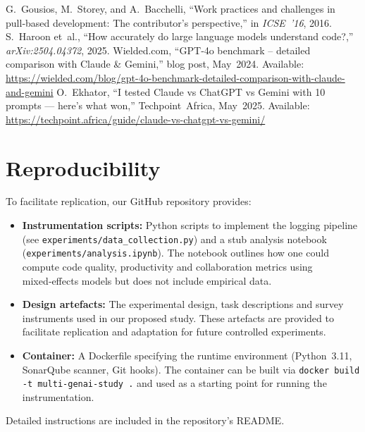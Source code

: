 \documentclass[conference]{IEEEtran}
\begin{document}
\begin{thebibliography}{99}
 G.~Gousios, M.~Storey, and A.~Bacchelli, “Work practices and challenges in pull‑based development: The contributor’s perspective,” in \emph{ICSE ’16}, 2016.
 S.~Haroon et~al., “How accurately do large language models understand code?,” \emph{arXiv:2504.04372}, 2025.
 Wielded.com, “GPT‑4o benchmark – detailed comparison with Claude & Gemini,” blog post, May 2024.  Available: \url{https://wielded.com/blog/gpt-4o-benchmark-detailed-comparison-with-claude-and-gemini}
 O.~Ekhator, “I tested Claude vs ChatGPT vs Gemini with 10 prompts — here’s what won,” Techpoint Africa, May 2025.  Available: \url{https://techpoint.africa/guide/claude-vs-chatgpt-vs-gemini/}
\end{thebibliography}

\appendix
\section{Reproducibility}
To facilitate replication, our GitHub repository provides:
\begin{itemize}
  \item \textbf{Instrumentation scripts:} Python scripts to implement the logging pipeline (see \texttt{experiments/data\_collection.py}) and a stub analysis notebook (\texttt{experiments/analysis.ipynb}).  The notebook outlines how one could compute code quality, productivity and collaboration metrics using mixed‑effects models but does not include empirical data.
  \item \textbf{Design artefacts:} The experimental design, task descriptions and survey instruments used in our proposed study.  These artefacts are provided to facilitate replication and adaptation for future controlled experiments.
  \item \textbf{Container:} A Dockerfile specifying the runtime environment (Python 3.11, SonarQube scanner, Git hooks).  The container can be built via \texttt{docker build -t multi-genai-study .} and used as a starting point for running the instrumentation.
\end{itemize}
Detailed instructions are included in the repository’s README.
\end{document}
